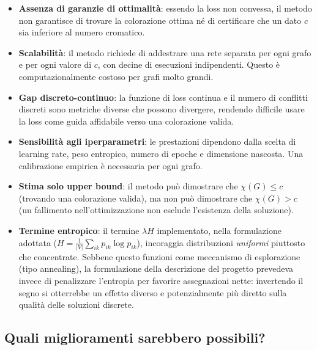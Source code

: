 \documentclass[11pt, a4paper]{article}
\begin{document}
\begin{itemize}
    \item \textbf{Assenza di garanzie di ottimalità}: essendo la loss non convessa, il
    metodo non garantisce di trovare la colorazione ottima né di certificare che un dato
    $c$ sia inferiore al numero cromatico.
    \item \textbf{Scalabilità}: il metodo richiede di addestrare una rete separata per
    ogni grafo e per ogni valore di $c$, con decine di esecuzioni indipendenti. Questo è
    computazionalmente costoso per grafi molto grandi.
    \item \textbf{Gap discreto-continuo}: la funzione di loss continua e il numero di
    conflitti discreti sono metriche diverse che possono divergere, rendendo difficile
    usare la loss come guida affidabile verso una colorazione valida.
    \item \textbf{Sensibilità agli iperparametri}: le prestazioni dipendono dalla scelta di
    learning rate, peso entropico, numero di epoche e dimensione nascosta. Una
    calibrazione empirica è necessaria per ogni grafo.
    \item \textbf{Stima solo upper bound}: il metodo può dimostrare che $\chi(G) \leq c$
    (trovando una colorazione valida), ma non può dimostrare che $\chi(G) > c$ (un
    fallimento nell'ottimizzazione non esclude l'esistenza della soluzione).
    \item \textbf{Termine entropico}: il termine $\lambda H$ implementato, nella formulazione
    adottata ($H = \frac{1}{|V|}\sum_{ik} p_{ik}\log p_{ik}$), incoraggia distribuzioni
    \emph{uniformi} piuttosto che concentrate. Sebbene questo funzioni come meccanismo di
    esplorazione (tipo annealing), la formulazione della descrizione del progetto prevedeva
    invece di penalizzare l'entropia per favorire assegnazioni nette: invertendo il segno
    si otterrebbe un effetto diverso e potenzialmente più diretto sulla qualità delle
    soluzioni discrete.
\end{itemize}

\subsection*{Quali miglioramenti sarebbero possibili?}
\end{document}
